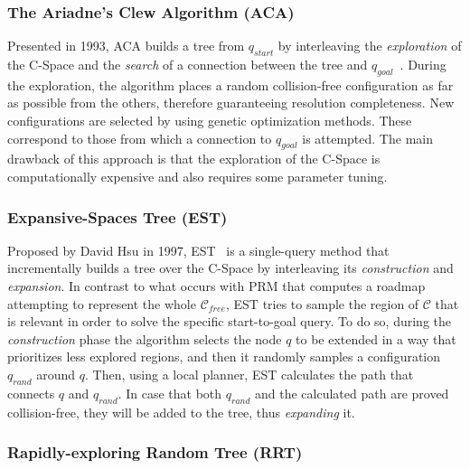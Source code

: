 \subsubsection{The Ariadne's Clew Algorithm (ACA)}

Presented in 1993, \ac{ACA} builds a tree from $q_{start}$ by interleaving the
\textit{exploration} of the \ac{C-Space} and the \textit{search} of a connection
between the tree and $q_{goal}$~\cite{Bessiere1993,Mazer1998}. During the
exploration, the algorithm places a random collision-free configuration as far
as possible from the others, therefore guaranteeing resolution completeness. New
configurations are selected by using genetic optimization methods. These
correspond to those from which a connection to $q_{goal}$ is attempted. The main
drawback of this approach is that the exploration of the \ac{C-Space} is
computationally expensive and also requires some parameter tuning.

\subsubsection{Expansive-Spaces Tree (EST)}

Proposed by David Hsu \etal in 1997,
\ac{EST}~\cite{Hsu1997,Hsu1999,Hsu2000,Hsu2002} is a single-query method that
incrementally builds a tree over the \ac{C-Space} by interleaving its
\textit{construction} and \textit{expansion}. In contrast to what occurs with
\ac{PRM} that computes a roadmap attempting to represent the whole
$\mathcal{C}_{free}$, \ac{EST} tries to sample the region of $\mathcal{C}$ that
is relevant in order to solve the specific start-to-goal query. To do so, during
the \textit{construction} phase the algorithm selects the node $q$ to be
extended in a way that prioritizes less explored regions, and then it randomly
samples a configuration $q_{rand}$ around $q$. Then, using a local planner,
\ac{EST} calculates the path that connects $q$ and $q_{rand}$. In case that both
$q_{rand}$ and the calculated path are proved collision-free, they will be added
to the tree, thus \textit{expanding} it.

\subsubsection{Rapidly-exploring Random Tree (RRT)}
\label{sec:RRT}


